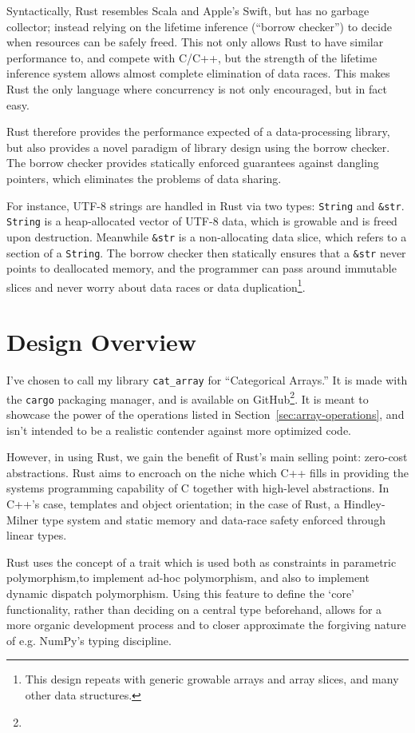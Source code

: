 \documentclass{DIKU-report-variant}
\begin{document}
Syntactically, Rust resembles Scala and Apple's Swift, but has no garbage collector; instead relying
on the lifetime inference (``borrow checker'') to decide when resources can be safely freed. This not
only allows Rust to have similar performance to, and compete with C/C++, but the strength of the lifetime
inference system allows almost complete elimination of data races. This makes Rust the only language
where concurrency is not only encouraged, but in fact easy.

Rust therefore provides the performance expected of a data-processing library, but also
provides a novel paradigm of library design using the borrow checker. The borrow checker provides
statically enforced guarantees against dangling pointers, which eliminates the problems
of data sharing.

For instance, UTF-8 strings are handled in Rust via two types: \texttt{String} and \texttt{\&str}.
\texttt{String} is a heap-allocated vector of UTF-8 data, which is growable and is freed upon destruction.
Meanwhile \texttt{\&str} is a non-allocating data slice, which refers to a section of a \texttt{String}.
The borrow checker then statically ensures that a \texttt{\&str} never points to deallocated memory, and
the programmer can pass around immutable slices and never worry about data races or data duplication\footnote{
This design repeats with generic growable arrays and array slices, and many other data structures.}.

\section{Design Overview}

I've chosen to call my library \texttt{cat\_array} for ``Categorical Arrays.''  It is made with the
\texttt{cargo} packaging manager, and is available on GitHub\footnote{%
}. It is meant to showcase the power of the operations listed in Section~\ref{sec:array-operations},
and isn't intended to be a realistic contender against more optimized code.

However, in using Rust, we gain the benefit of Rust's main selling point: zero-cost abstractions.
Rust aims to encroach on the niche which C++ fills in providing the systems programming capability
of C together with high-level abstractions. In C++'s case, templates and object orientation; in the
case of Rust, a Hindley-Milner type system and static memory and data-race safety enforced through
linear types.

Rust uses the concept of a trait which is used both as constraints in parametric polymorphism,to
implement ad-hoc polymorphism, and also to implement dynamic dispatch polymorphism. Using this feature
to define the `core' functionality, rather than deciding on a central type beforehand, allows for
a more organic development process and to closer approximate the forgiving nature of e.g. NumPy's
typing discipline.
\end{document}
